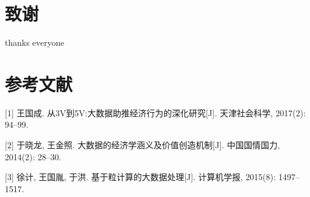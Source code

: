 \documentclass[]{article}
\begin{document}
\hypertarget{sec:ux81f4ux8c22}{%
\section*{致谢}\label{sec:ux81f4ux8c22}}

thanks everyone

\hypertarget{sec:ux53c2ux8003ux6587ux732e}{%
\section*{参考文献}\label{sec:ux53c2ux8003ux6587ux732e}}

\hypertarget{refs}{}
\leavevmode\hypertarget{ref-ux738bux56fdux62102017ux4ece}{}%
{[}1{]} 王国成. 从3V到5V:大数据助推经济行为的深化研究{[}J{]}.
天津社会科学, 2017(2): 94--99.

\leavevmode\hypertarget{ref-ux4e8eux6653ux9f992014ux5927ux6570ux636eux7684ux7ecfux6d4eux5b66ux6db5ux4e49ux53caux4ef7ux503cux521bux9020ux673aux5236}{}%
{[}2{]} 于晓龙, 王金照. 大数据的经济学涵义及价值创造机制{[}J{]}.
中国国情国力, 2014(2): 28--30.

\leavevmode\hypertarget{ref-ux5f90ux8ba12015ux57faux4e8eux7c92ux8ba1ux7b97ux7684ux5927ux6570ux636eux5904ux7406}{}%
{[}3{]} 徐计, 王国胤, 于洪. 基于粒计算的大数据处理{[}J{]}. 计算机学报,
2015(8): 1497--1517.
\end{document}
